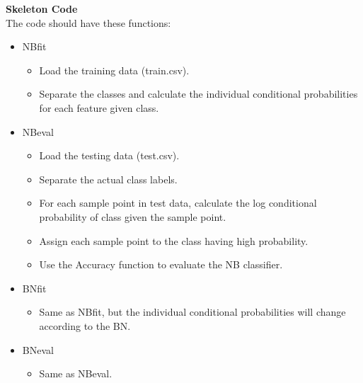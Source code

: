 \documentclass[addpoints,11pt,a4paper]{exam}
\begin{document}
\begin{questions}
\textbf{Skeleton Code}\\
The code should have these functions:
\begin{itemize}
    \item NBfit
    \begin{itemize}
        \item Load the training data (train.csv). 
        \item Separate the classes and calculate the individual conditional probabilities for each feature given class.
    \end{itemize}
    \item NBeval
    \begin{itemize}
        \item Load the testing data (test.csv).
        \item Separate the actual class labels.
        \item For each sample point in test data, calculate the log conditional probability of class given the sample point.
        \item Assign each sample point to the class having high probability.
        \item Use the Accuracy function to evaluate the NB classifier.
    \end{itemize}
    \item BNfit
    \begin{itemize}
        \item Same as NBfit, but the individual conditional probabilities will change according to the BN.
    \end{itemize}
    \item BNeval
    \begin{itemize}
        \item Same as NBeval.
    \end{itemize}
\end{itemize}

\end{questions}
\end{document}
